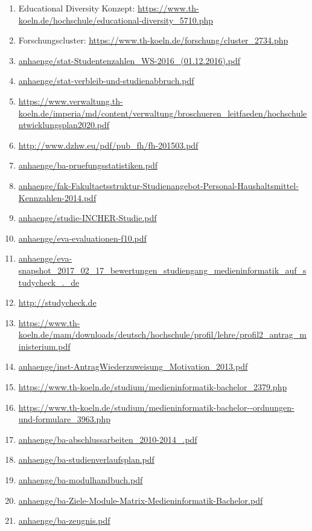 \documentclass[BCOR12mm,DIV11,titlepage,a4paper,oneside,10pt]{scrbook}
\begin{document}
\begin{sloppypar}
\begin{flushleft}

\begin{enumerate}
\item{Educational Diversity Konzept: \url{https://www.th-koeln.de/hochschule/educational-diversity\_5710.php} } 
\item{Forschungscluster: \url{https://www.th-koeln.de/forschung/cluster\_2734.php} } 
\item{\url{anhaenge/stat-Studentenzahlen\_WS-2016\_(01.12.2016).pdf}} 
\item{\url{anhaenge/stat-verbleib-und-studienabbruch.pdf}} 
\item{\url{https://www.verwaltung.th-koeln.de/imperia/md/content/verwaltung/broschueren\_leitfaeden/hochschulentwicklungsplan2020.pdf}} 
\item{\url{http://www.dzhw.eu/pdf/pub\_fh/fh-201503.pdf}} 
\item{\url{anhaenge/ba-pruefungsstatistiken.pdf}} 
\item{\url{anhaenge/fak-Fakultaetsstruktur-Studienangebot-Personal-Haushaltsmittel-Kennzahlen-2014.pdf}} 
\item{\url{anhaenge/studie-INCHER-Studie.pdf}} 
\item{\url{anhaenge/eva-evaluationen-f10.pdf}} 
\item{\url{anhaenge/eva-snapshot\_2017\_02\_17\_bewertungen\_studiengang\_medieninformatik\_auf\_studycheck\_.\_de}} 
\item{\url{http://studycheck.de}} 
\item{\url{https://www.th-koeln.de/mam/downloads/deutsch/hochschule/profil/lehre/profil2\_antrag\_ministerium.pdf}} 
\item{\url{anhaenge/inst-AntragWiederzuweisung\_Motivation\_2013.pdf}} 
\item{\url{https://www.th-koeln.de/studium/medieninformatik-bachelor\_2379.php}} 
\item{\url{https://www.th-koeln.de/studium/medieninformatik-bachelor--ordnungen-und-formulare\_3963.php}} 
\item{\url{anhaenge/ba-abschlussarbeiten\_2010-2014\_.pdf}} 
\item{\url{anhaenge/ba-studienverlaufsplan.pdf}} 
\item{\url{anhaenge/ba-modulhandbuch.pdf}} 
\item{\url{anhaenge/ba-Ziele-Module-Matrix-Medieninformatik-Bachelor.pdf}} 
\item{\url{anhaenge/ba-zeugnis.pdf}} 

\end{enumerate}
\end{flushleft}
\end{sloppypar}
\end{document}
